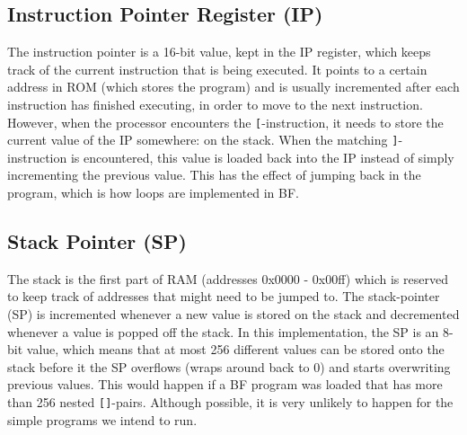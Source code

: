 \subsection{Instruction Pointer Register (IP)}
The instruction pointer is a 16-bit value, kept in the IP register, which keeps track of the current instruction that is being executed. It points to a certain address in ROM (which stores the program) and is usually incremented after each instruction has finished executing, in order to move to the next instruction. However, when the processor encounters the \texttt{[}-instruction, it needs to store the current value of the IP somewhere: on the stack. When the matching \texttt{]}-instruction is encountered, this value is loaded back into the IP instead of simply incrementing the previous value. This has the effect of jumping back in the program, which is how loops are implemented in BF.

\subsection{Stack Pointer (SP)}
The stack is the first part of RAM (addresses 0x0000 - 0x00ff) which is reserved to keep track of addresses that might need to be jumped to. The stack-pointer (SP) is incremented whenever a new value is stored on the stack and decremented whenever a value is popped off the stack. In this implementation, the SP is an 8-bit value, which means that at most 256 different values can be stored onto the stack before it the SP overflows (wraps around back to 0) and starts overwriting previous values. This would happen if a BF program was loaded that has more than 256 nested \texttt{[]}-pairs. Although possible, it is very unlikely to happen for the simple programs we intend to run.

